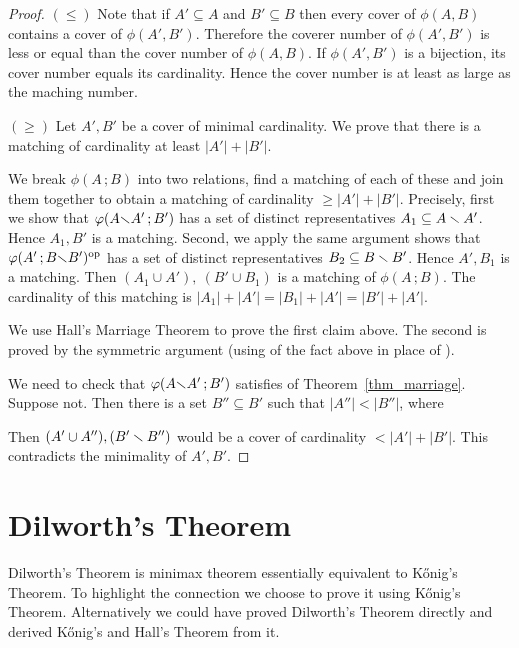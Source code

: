 \documentclass[scombinatorics.tex]{subfiles}
\begin{document}
\begin{proof}
  {\boldmath$(\le)$}
  Note that if $A'\subseteq A$ and $B'\subseteq B$ then every cover of $\phi(A,B)$ contains a cover of $\phi(A',B')$.
  Therefore the coverer number of $\phi(A',B')$ is less or equal than the cover number of $\phi(A,B)$.
  If $\phi(A',B')$ is a bijection, its cover number equals its cardinality.
  Hence the cover number is at least as large as the maching number.

  {\boldmath$(\ge)$}
  Let $A',B'$ be a cover of minimal cardinality. 
  We prove that there is a matching of cardinality at least $|A'|+|B'|$.

  We break $\phi(A\,;B)$ into two relations, find a matching of each of these and join them together to obtain a matching of cardinality $\ge|A'|+|B'|$.
  Precisely, first we show that $\varphi(A{\smallsetminus} A'\,;B')$ has a set of distinct representatives $A_1\subseteq A\smallsetminus A'$.
  Hence $A_1,B'$ is a matching.
  Second, we apply the same argument shows that $\varphi(A'\,;B{\smallsetminus} B')^{\rm op}$ has a  set of distinct representatives $B_2\subseteq B\smallsetminus B'$.
  Hence $A',B_1$ is a matching.
  Then $(A_1\cup A'),\ (B'\cup B_1)$ is a matching of  $\phi(A\,;B)$.
  The cardinality of this matching is $|A_1|+|A'|=|B_1|+|A'|=|B'|+|A'|$.
  
  We use Hall's Marriage Theorem to prove the first claim above.
  The second is proved by the symmetric argument (using  of the fact above in place of ). 

  We need to check that $\varphi(A{\smallsetminus} A'\,;B')$ satisfies  of Theorem~\ref{thm_marriage}.
  Suppose not. Then there is a set $B''\subseteq B'$ such that $|A''|<|B''|$, where


  Then $(A'\cup A''), (B'\smallsetminus B'')$ would be a cover of cardinality $<|A'|+|B'|$.
  This contradicts the minimality of $A',B'$.
\end{proof}

\section{Dilworth's Theorem}\label{shadow}

Dilworth's Theorem is minimax theorem essentially equivalent to K\H{o}nig's Theorem.
To highlight the connection we choose to prove it using K\H{o}nig's Theorem. 
Alternatively we could have proved Dilworth's Theorem directly and derived K\H{o}nig's and Hall's Theorem from it.
\end{document}
